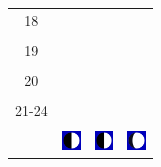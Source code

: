 \documentclass[a4paper,12pt, tikz]{scrartcl}
\begin{document}
\begin{tabularx}{\linewidth}{|c|X|X|X|}
      \hline
      18&   &       &    \\
        &   &       &    \\
      \hline
      19&   &       &    \\
        &   &       &    \\
      \hline
      20&   &       &    \\
        &   &       &    \\
      \hline
      21-24&   &       &    \\
        &   &       &    \\
      \hline  
      & \vspace{0.01cm} \centerline{\includegraphics[width=0.5cm]{moon_phases/Moon_phase_2.svg.png}} \vspace{0.1cm} & \vspace{0.01cm} \centerline{\includegraphics[width=0.5cm]{moon_phases/Moon_phase_2.svg.png}} \vspace{0.1cm} & \vspace{0.01cm} \centerline{\includegraphics[width=0.5cm]{moon_phases/Moon_phase_3.svg.png}} \vspace{0.1cm}\\
      \hline   
    \end{tabularx}




    \newpage

        \noindent
\end{document}
